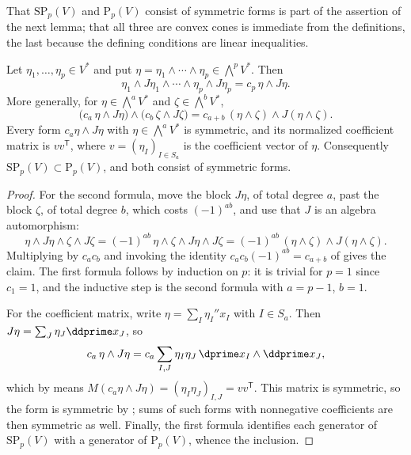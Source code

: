 That $\mathrm{SP}_p(V)$ and $\mathrm{P}_p(V)$ consist of symmetric forms is
part of the assertion of the next lemma; that all three are convex cones is
immediate from the definitions, the last because the defining conditions are
linear inequalities.

\begin{lemma}
\label{lem:ch09-generators}
Let $\eta_1,\ldots,\eta_p\in V^*$ and put
$\eta=\eta_1\wedge\cdots\wedge\eta_p\in\bigwedge^pV^*$.  Then
\[
 \eta_1\wedge J\eta_1\wedge\cdots\wedge\eta_p\wedge J\eta_p
 =c_p\,\eta\wedge J\eta .
\]
More generally, for $\eta\in\bigwedge^aV^*$ and
$\zeta\in\bigwedge^bV^*$,
\[
 \bigl(c_a\,\eta\wedge J\eta\bigr)\wedge
 \bigl(c_b\,\zeta\wedge J\zeta\bigr)
 =c_{a+b}\,(\eta\wedge\zeta)\wedge J(\eta\wedge\zeta).
\]
Every form $c_a\eta\wedge J\eta$ with $\eta\in\bigwedge^aV^*$ is symmetric,
and
its normalized coefficient matrix is $vv^{\mathsf T}$, where
$v=(\eta_I)_{I\in S_a}$ is the coefficient vector of $\eta$.  Consequently
$\mathrm{SP}_p(V)\subset\mathrm{P}_p(V)$, and both consist of symmetric
forms.
\end{lemma}

\begin{proof}
For the second formula, move the block $J\eta$, of total degree $a$, past the
block $\zeta$, of total degree $b$, which costs $(-1)^{ab}$, and use that $J$
is an algebra automorphism:
\[
 \eta\wedge J\eta\wedge\zeta\wedge J\zeta
 =(-1)^{ab}\,\eta\wedge\zeta\wedge J\eta\wedge J\zeta
 =(-1)^{ab}\,(\eta\wedge\zeta)\wedge J(\eta\wedge\zeta).
\]
Multiplying by $c_ac_b$ and invoking the identity
$c_ac_b(-1)^{ab}=c_{a+b}$ of  gives the claim.  The
first formula follows by induction on $p$: it is trivial for $p=1$ since
$c_1=1$, and the inductive step is the second formula with $a=p-1$, $b=1$.

For the coefficient matrix, write $\eta=\sum_I\eta_I\dprime x_I$ with
$I\in S_a$.  Then $J\eta=\sum_J\eta_J\ddprime x_J$, so
\[
 c_a\,\eta\wedge J\eta
 =c_a\sum_{I,J}\eta_I\eta_J\,\dprime x_I\wedge\ddprime x_J,
\]
which by  means
$M(c_a\eta\wedge J\eta)=(\eta_I\eta_J)_{I,J}=vv^{\mathsf T}$.  This matrix is
symmetric, so the form is symmetric by
; sums of such forms with nonnegative
coefficients are then symmetric as well.  Finally, the first formula
identifies each generator of $\mathrm{SP}_p(V)$ with a generator of
$\mathrm{P}_p(V)$, whence the inclusion.
\end{proof}

